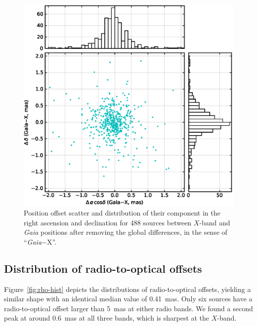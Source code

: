 \documentclass{aa-note}   %
\begin{document}
\begin{figure}[hbtp]
    \centering
    \includegraphics[width=\columnwidth]{figs/gaia-sx-scatter}
    \caption[]{\label{fig:gdr2-sx-pos-offset}
        Position offset scatter and distribution of their component in the right ascension and declination for 488 sources between $X$-band and {\it Gaia} positions after removing the global differences, in the sense of ``{\it Gaia}$-$X''.
    }
\end{figure}

\subsection{Distribution of radio-to-optical offsets}    \label{subsec:r2o-dist}

Figure~\ref{fig:rho-hist} depicts the distributions of radio-to-optical offsets, yielding a similar shape with an identical median value of 0.41~mas.
Only six sources have a radio-to-optical offset larger than 5~mas at either radio bands.
We found a second peak at around 0.6~mas at all three bands, which is sharpest at the $X$-band.
\end{document}
